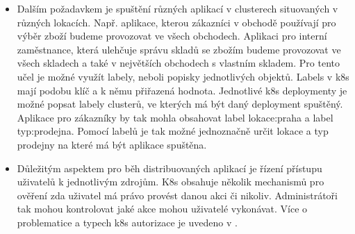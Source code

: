 \begin{itemize}
\item Dalším požadavkem je spuštění různých aplikací v clusterech situovaných \linebreak v různých lokacích. Např. aplikace, kterou zákazníci v obchodě používají pro výběr zboží budeme provozovat ve všech obchodech. Aplikaci pro interní zaměstnance, která ulehčuje správu skladů se zbožím budeme provozovat ve všech skladech a také v největších obchodech s vlastním skladem. Pro tento učel je možné využít labely, neboli popisky jednotlivých objektů. Labels v k8s mají \linebreak podobu klíč a k němu přiřazená hodnota. Jednotlivé k8s deploymenty je možné popsat labely clusterů, ve kterých má být daný deployment spuštěný. Aplikace pro zákazníky by tak mohla obsahovat label lokace:praha a label typ:prodejna. Pomocí labelů je tak možné jednoznačně určit lokace a typ prodejny na které má být aplikace spuštěna. 
\item Důležitým aspektem pro běh distribuovaných aplikací je řízení přístupu uživatelů k jednotlivým zdrojům. K8s obsahuje několik mechanismů pro ověření zda uživatel má právo provést danou akci či nikoliv. Administrátoři tak mohou kontrolovat jaké akce mohou uživatelé vykonávat. Více o problematice a typech k8s autorizace je uvedeno v \cite{k8sauth}.
\end{itemize}
